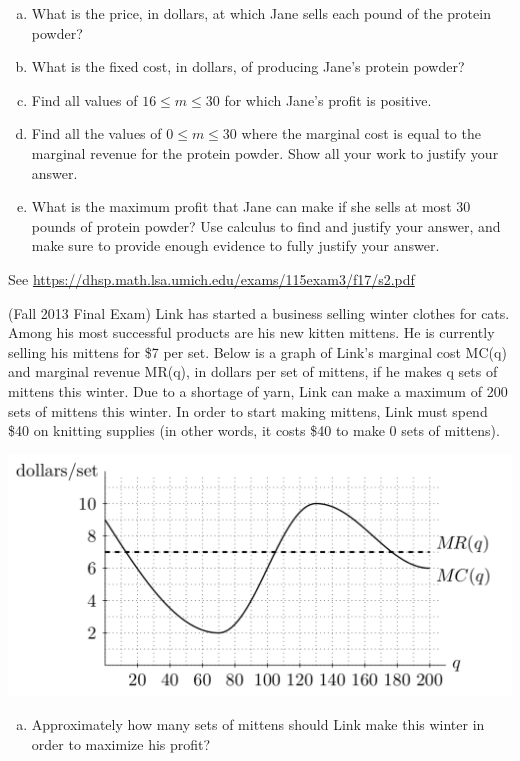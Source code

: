 \documentclass[11pt]{exam}
\begin{document}
\begin{questions}
	\begin{enumerate}[(a)]
		\item What is the price, in dollars, at which Jane sells each pound of the protein powder?
		\item What is the fixed cost, in dollars, of producing Jane's protein powder?
		\item Find all values of $16 \leqslant m \leqslant 30$ for which Jane's profit is positive.
		\item Find all the values of $0 \leqslant m \leqslant 30$ where the marginal cost is equal to the marginal revenue for the protein powder. Show all your work to justify your answer.
		\item What is the maximum profit that Jane can make if she sells at most 30 pounds of protein powder? Use calculus to find and justify your answer, and make sure to provide enough evidence to fully justify your answer.
		\end{enumerate}
                \begin{solution}
                  See \href{https://dhsp.math.lsa.umich.edu/exams/115exam3/f17/s2.pdf}{https://dhsp.math.lsa.umich.edu/exams/115exam3/f17/s2.pdf}
                \end{solution}
\question (Fall 2013 Final Exam) %
Link has started a business selling winter clothes for cats. Among his most successful products are his new kitten mittens. He is currently selling his mittens for \$7 per set. Below is a graph of Link's marginal cost MC(q) and marginal revenue MR(q), in dollars per set of mittens, if he makes q sets of mittens this winter. Due to a shortage of yarn, Link can make a maximum of 200 sets of mittens this winter. In order to start making mittens, Link must spend \$40 on knitting supplies (in other words, it costs \$40 to make 0 sets of mittens).	
\begin{center}
  \includegraphics[scale=0.5]{Figures/link}
\end{center}
\begin{enumerate}[(a)]
	\item Approximately how many sets of mittens should Link make this winter in order to maximize his profit?
	

\end{enumerate}
\end{questions}
\end{document}
